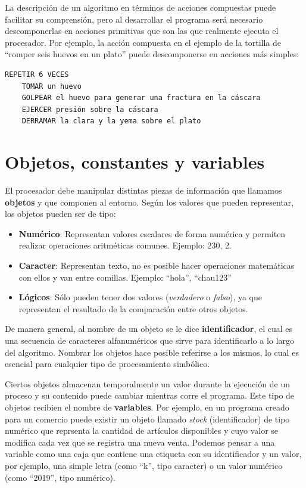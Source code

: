 \documentclass[]{book}
\providecommand{\tightlist}{%
  \setlength{\itemsep}{0pt}\setlength{\parskip}{0pt}}
\begin{document}
La descripción de un algoritmo en términos de acciones compuestas puede
facilitar su comprensión, pero al desarrollar el programa será necesario
descomponerlas en acciones primitivas que son las que realmente ejecuta
el procesador. Por ejemplo, la acción compuesta en el ejemplo de la
tortilla de ``romper seis huevos en un plato'' puede descomponerse en
acciones más simples:

\begin{verbatim}
REPETIR 6 VECES
    TOMAR un huevo
    GOLPEAR el huevo para generar una fractura en la cáscara
    EJERCER presión sobre la cáscara
    DERRAMAR la clara y la yema sobre el plato
\end{verbatim}

\section{Objetos, constantes y
variables}\label{objetos-constantes-y-variables}

El procesador debe manipular distintas piezas de información que
llamamos \textbf{objetos} y que componen al entorno. Según los valores
que pueden representar, los objetos pueden ser de tipo:

\begin{itemize}
\tightlist
\item
  \textbf{Numérico}: Representan valores escalares de forma numérica y
  permiten realizar operaciones aritméticas comunes. Ejemplo: 230, 2.
\item
  \textbf{Caracter}: Representan texto, no es posible hacer operaciones
  matemáticas con ellos y van entre comillas. Ejemplo: ``hola'',
  ``chau123''
\item
  \textbf{Lógicos}: Sólo pueden tener dos valores (\emph{verdadero} o
  \emph{falso}), ya que representan el resultado de la comparación entre
  otros objetos.
\end{itemize}

De manera general, al nombre de un objeto se le dice
\textbf{identificador}, el cual es una secuencia de caracteres
alfanuméricos que sirve para identificarlo a lo largo del algoritmo.
Nombrar los objetos hace posible referirse a los mismos, lo cual es
esencial para cualquier tipo de procesamiento simbólico.

Ciertos objetos almacenan temporalmente un valor durante la ejecución de
un proceso y su contenido puede cambiar mientras corre el programa. Este
tipo de objetos recibien el nombre de \textbf{variables}. Por ejemplo,
en un programa creado para un comercio puede existir un objeto llamado
\emph{stock} (identificador) de tipo numérico que reprsenta la cantidad
de artículos disponibles y cuyo valor se modifica cada vez que se
registra una nueva venta. Podemos pensar a una variable como una caja
que contiene una etiqueta con su identificador y un valor, por ejemplo,
una simple letra (como ``k'', tipo caracter) o un valor numérico (como
``2019'', tipo numérico).
\end{document}
